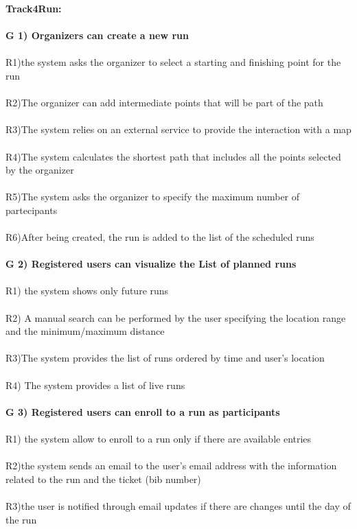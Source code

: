 \textbf{Track4Run:}\\ \\
\textbf{G 1) Organizers can create a new run} \\ \\
R1)the system asks the organizer to select a starting and finishing point for the run \\ \\
R2)The organizer can add intermediate points that will be part of the path \\ \\
R3)The system relies on an external service to provide the interaction with a map \\ \\
R4)The system calculates the shortest path that includes all the points selected by the organizer \\ \\   
R5)The system asks the organizer to specify the maximum number of partecipants \\ \\
R6)After being created, the run is added to the list of the scheduled runs \\ \\
\textbf{G 2) Registered users can visualize the List of planned runs} \\ \\
R1) the system shows only future runs \\ \\ 
R2) A manual search can be performed by the user specifying the location range and the minimum/maximum distance \\ \\ 
R3)The system provides the list of runs ordered by time and user’s location \\ \\
R4) The system provides a list of live runs \\ \\
\textbf{G 3) Registered users can enroll to a run as participants} \\ \\
R1) the system allow to enroll to a run only if there are available entries \\ \\
R2)the system sends an email to the user’s email address with the information related to the run and the ticket (bib number) \\ \\
R3)the user is notified through email updates if there are changes until the day of the run \\ \\
